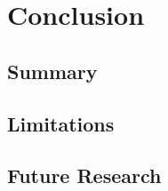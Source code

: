 \chapter{Conclusion} %

\label{Chapter7} %


\section{Summary}\label{sec:ConclusionSummary}

\todosection


\section{Limitations}\label{sec:ConclusionLimitations}

\todosection


\section{Future Research}\label{sec:ConclusionFutureResearch}

\todosection